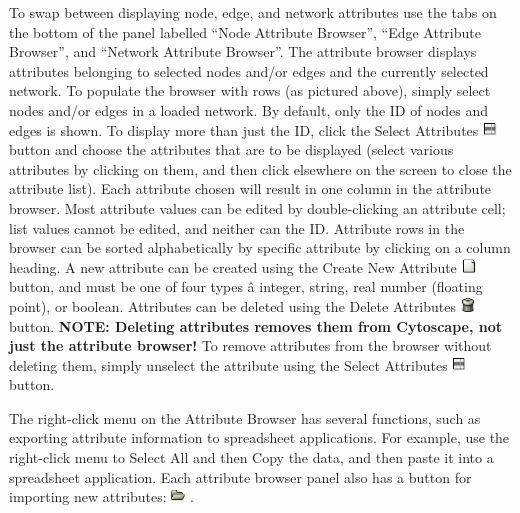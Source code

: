  To swap between displaying node, edge, and network attributes use the tabs on
the bottom of the panel labelled ``Node Attribute Browser'', ``Edge Attribute
Browser'', and ``Network Attribute Browser''. The attribute browser displays
attributes belonging to selected nodes and/or edges and the currently selected
network. To populate the browser with rows (as pictured above), simply select
nodes and/or edges in a loaded network. By default, only the ID of nodes and
edges is shown. To display more than just the ID, click the Select Attributes
\includegraphics[width=1em]{images/attributes_select_icon.png}  button and choose
the attributes that are to be displayed (select various attributes by clicking
on them, and then click elsewhere on the screen to close the attribute list).
Each attribute chosen will result in one column in the attribute browser. Most
attribute values can be edited by double-clicking an attribute cell; list
values cannot be edited, and neither can the ID. Attribute rows in the browser
can be sorted alphabetically by specific attribute by clicking on a column
heading. A new attribute can be created using the Create New Attribute
\includegraphics[width=1em]{images/attributes_new_icon.png}  button, and must be
one of four types \^a integer, string, real number (floating point), or
boolean. Attributes can be deleted using the Delete Attributes
\includegraphics[width=1em]{images/attributes_delete_icon.png}  button.
\textbf{NOTE: Deleting attributes removes them from Cytoscape, not just the
attribute browser!} To remove attributes from the browser without deleting
them, simply unselect the attribute using the Select Attributes
\includegraphics[width=1em]{images/attributes_select_icon.png}  button. 

The right-click menu on the Attribute Browser has several functions, such as
exporting attribute information to spreadsheet applications. For example, use
the right-click menu to Select All and then Copy the data, and then paste it
into a spreadsheet application. Each attribute browser panel also has a button
for importing new attributes:
\includegraphics[width=1em]{images/attributes_import_icon.png}  . 

